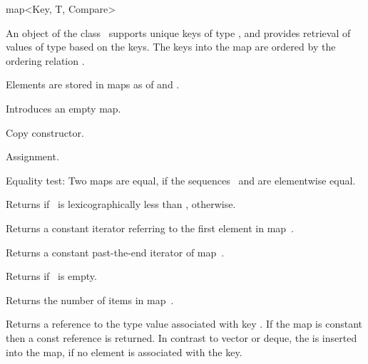 
\ccHtmlNoClassLinks
\begin{ccClassTemplate} {map<Key, T, Compare>}


\ccDefinition
An object of the class \ccClassTemplateName\ supports unique keys of 
type , and provides retrieval of values of type 
based on the keys. The keys into the map are ordered by the ordering
relation .

Elements are stored in maps as  of  and 
.


\ccTypes
{}


\ccCreation
{}


             {Introduces an empty map.}

 	    {Copy constructor.}

\ccOperations


        {Assignment.}

{Equality test: Two maps are equal, if the sequences \ccVar\ and 
 are elementwise equal.}


{Returns  if \ccVar\ is lexicographically less than ,
  otherwise.}

       {Returns a constant iterator referring to the first element in
        map~\ccVar.}

       {Returns a constant past-the-end iterator of map~\ccVar.}

	{Returns  if \ccVar\ is empty.}

	{Returns the number of items in map~\ccVar.}

{Returns a reference to the type  value associated with
key . If the map is constant then a const reference is 
returned. In contrast to vector or deque, the 
is inserted into the map, if no element is associated with the key.}


\end{ccClassTemplate}

